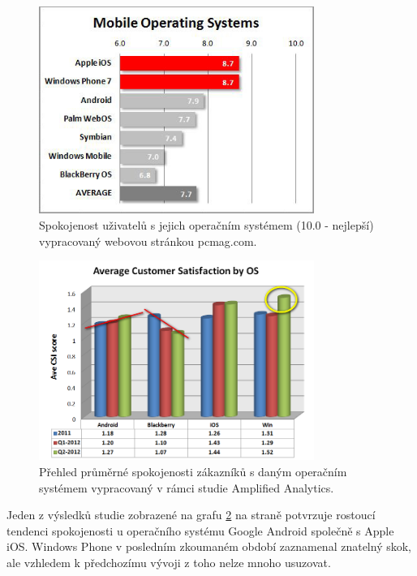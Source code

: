 \documentclass[thesis=M,czech]{FITthesis}[2012/06/26]
\begin{document}
\begin{figure}[p]\centering
	\includegraphics[width=0.8\textwidth]{figures/339723-mobile-operating-systems}
	\caption{Spokojenost uživatelů s jejich operačním systémem (10.0 - nejlepší) vypracovaný webovou stránkou pcmag.com.\protect\cite{pcmag}}
	\label{fig:satisfaction}
\end{figure}
\begin{figure}[p]\centering
	\includegraphics[width=0.8\textwidth]{figures/CSI-by-OS-Q2-12}
	\caption{Přehled průměrné spokojenosti zákazníků s daným operačním systémem vypracovaný v rámci studie Amplified Analytics.\protect\cite{amplified}}
	\label{fig:satisfaction2}
\end{figure}

Jeden z výsledků studie zobrazené na grafu \ref{fig:satisfaction2} na straně \pageref{fig:satisfaction2} potvrzuje rostoucí tendenci spokojenosti u operačního systému Google Android společně s Apple iOS. Windows Phone v posledním zkoumaném období zaznamenal znatelný skok, ale vzhledem k předchozímu vývoji z toho nelze mnoho usuzovat.
\end{document}
